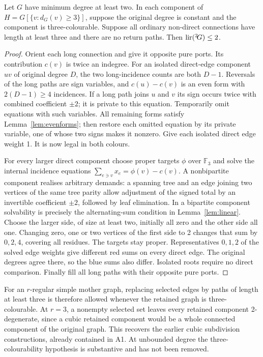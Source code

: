 \begin{theorem}[A3]\label{thm:homogeneous}
Let $G$ have minimum degree at least two. In each component of
$H=G[\{v:d_G(v)\ge3\}]$, suppose the original degree is constant and
the component is three-colourable. Suppose all ordinary non-direct
connections have length at least three and there are no return paths.
Then $\operatorname{lir}({}^{2}\!G)\le2$.
\end{theorem}
\begin{proof}
Orient each long connection and give it opposite pure ports. Its
contribution $c(v)$ is twice an indegree. For an isolated direct-edge
component $uv$ of original degree $D$, the two long-incidence counts
are both $D-1$. Reversals of the long paths are sign variables, and
$c(u)-c(v)$ is an even form with $2(D-1)\ge4$ incidences. If a long
path joins $u$ and $v$ its sign occurs twice with combined coefficient
$\pm2$; it is private to this equation. Temporarily omit equations
with such variables. All remaining forms satisfy
Lemma~\ref{lem:evenforms}; then restore each omitted equation by its
private variable, one of whose two signs makes it nonzero. Give each
isolated direct edge weight 1. It is now legal in both colours.

For every larger direct component choose proper targets $\phi$ over
$\mathbb F_3$ and solve the internal incidence equations
$\sum_{e\ni v}x_e=\phi(v)-c(v)$. A nonbipartite component realises
arbitrary demands: a spanning tree and an edge joining two vertices
of the same tree parity allow adjustment of the signed total by an
invertible coefficient $\pm2$, followed by leaf elimination. In a
bipartite component solvability is precisely the alternating-sum
condition in Lemma~\ref{lem:linear}. Choose the larger side, of size
at least two, initially all zero and the other side all one. Changing
zero, one or two vertices of the first side to 2 changes that sum by
$0,2,4$, covering all residues. The targets stay proper. Representatives
$0,1,2$ of the solved edge weights give different red sums on every
direct edge. The original degrees agree there, so the blue sums also
differ. Isolated roots require no direct comparison. Finally fill
all long paths with their opposite pure ports.
\end{proof}

For an $r$-regular simple mother graph, replacing selected edges by
paths of length at least three is therefore allowed whenever the
retained graph is three-colourable. At $r=3$, a nonempty selected set
leaves every retained component 2-degenerate, since a cubic retained
component would be a whole connected component of the original graph.
This recovers the earlier cubic subdivision constructions, already
contained in A1. At unbounded degree the three-colourability hypothesis
is substantive and has not been removed.

